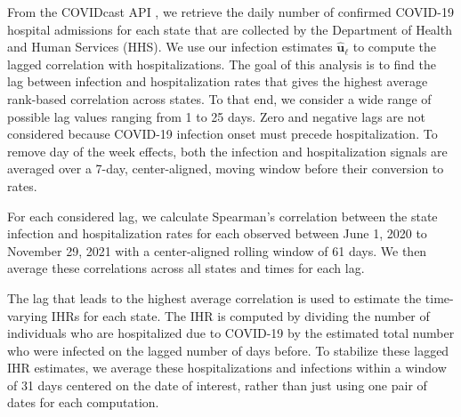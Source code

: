 From the COVIDcast API \citep{reinhart2021open}, we retrieve the daily number of
confirmed COVID-19 hospital admissions for each state that are collected by the
\US Department of Health and Human Services (HHS). We use our infection
estimates $\mathbf{\widehat{u}}_\ell$ to compute the lagged correlation with 
hospitalizations. The goal of this analysis is to find the lag between
infection and hospitalization rates that gives the highest average rank-based
correlation across \US states. To that end, we consider a wide range of possible
lag values ranging from 1 to 25 days. Zero and negative lags are not considered
because COVID-19 infection onset must precede hospitalization.
To remove day of the week effects, both the infection and hospitalization
signals are averaged over a 7-day, center-aligned, moving window before their
conversion to rates.

For each considered lag, we calculate Spearman's correlation between the state
infection and hospitalization rates for each observed between June 1, 2020 to
November 29, 2021 with a center-aligned rolling window of 61 days. We then
average these correlations across all states and times for each lag. 

The lag that leads to the highest average correlation is used to estimate the
time-varying IHRs for each state. The IHR is computed by dividing the number of
individuals who are hospitalized due to COVID-19 by the estimated total number
who were infected on the lagged number of days before. To stabilize these lagged
IHR estimates, we average these hospitalizations and infections within a window
of 31 days centered on the date of interest, rather than just using one pair of
dates for each computation.
